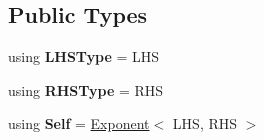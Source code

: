\subsection*{Public Types}
\begin{DoxyCompactItemize}
\item 
\hypertarget{classlatex_1_1math_1_1Exponent_ab3eab1448aad07c78b264be2991c5d79}{using {\bfseries L\-H\-S\-Type} = L\-H\-S}\label{classlatex_1_1math_1_1Exponent_ab3eab1448aad07c78b264be2991c5d79}

\item 
\hypertarget{classlatex_1_1math_1_1Exponent_adf3693cd0636a4ddf6e323d498eb4ae5}{using {\bfseries R\-H\-S\-Type} = R\-H\-S}\label{classlatex_1_1math_1_1Exponent_adf3693cd0636a4ddf6e323d498eb4ae5}

\item 
\hypertarget{classlatex_1_1math_1_1Exponent_acf1939d7c89c1030694ca61e09feb8b3}{using {\bfseries Self} = \hyperlink{classlatex_1_1math_1_1Exponent}{Exponent}$<$ L\-H\-S, R\-H\-S $>$}\label{classlatex_1_1math_1_1Exponent_acf1939d7c89c1030694ca61e09feb8b3}

\end{DoxyCompactItemize}
